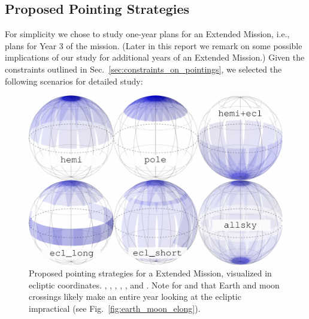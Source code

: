 \subsection{Proposed Pointing Strategies}
\label{sec:proposed_pointings}

For simplicity we chose to study one-year plans for an Extended
Mission, i.e., plans for Year 3 of the \tess mission. (Later in this
report we remark on some possible implications of our study for
additional years of an Extended Mission.)  Given the constraints
outlined in Sec.~\ref{sec:constraints_on_pointings}, we selected the
following scenarios for detailed study:

\begin{figure}[!bt]
	\includegraphics{figures/proposed_pointings_fin_names.pdf}
	\caption{Proposed pointing strategies for a \tess Extended Mission, visualized in ecliptic coordinates. \nhemi, \npole, \shemiAvoid, \elong, \eshort, and \hemis. Note for \elong\:and \eshort\:that Earth and moon crossings likely make an entire year looking at the ecliptic impractical (see Fig.~\protect\ref{fig:earth_moon_elong}).}
	\label{fig:proposed_pointings}
\end{figure}

